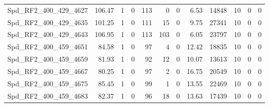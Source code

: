 \begin{longtable}[c]{@{}lrrrrrrrrrrr@{}}
Spd\_RF2\_400\_429\_4627     & 106.47                 & 1                       & 0                       & 113                    & 0                       & 0                       & 6.53                    & 14848                    & 10                       & 0                        & 0                        \\
Spd\_RF2\_400\_429\_4635     & 101.25                 & 1                       & 0                       & 111                    & 15                      & 0                       & 9.75                    & 27341                    & 10                       & 0                        & 0                        \\
Spd\_RF2\_400\_429\_4643     & 106.95                 & 1                       & 0                       & 113                    & 103                     & 0                       & 6.05                    & 23797                    & 10                       & 0                        & 0                        \\
Spd\_RF2\_400\_459\_4651     & 84.58                  & 1                       & 0                       & 97                     & 4                       & 0                       & 12.42                   & 18835                    & 10                       & 0                        & 0                        \\
Spd\_RF2\_400\_459\_4659     & 81.93                  & 1                       & 0                       & 92                     & 12                      & 0                       & 10.07                   & 13613                    & 10                       & 0                        & 0                        \\
Spd\_RF2\_400\_459\_4667     & 80.25                  & 1                       & 0                       & 97                     & 2                       & 0                       & 16.75                   & 20549                    & 10                       & 0                        & 0                        \\
Spd\_RF2\_400\_459\_4675     & 85.45                  & 1                       & 0                       & 99                     & 1                       & 0                       & 13.55                   & 22469                    & 10                       & 0                        & 0                        \\
Spd\_RF2\_400\_459\_4683     & 82.37                  & 1                       & 0                       & 96                     & 18                      & 0                       & 13.63                   & 17439                    & 10                       & 0                        & 0                        \\

\end{longtable}

